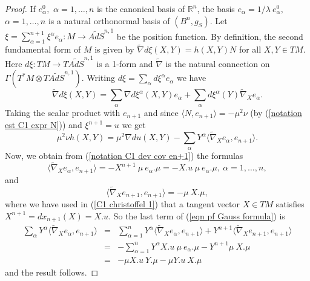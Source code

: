 \documentclass[10pt,reqno,oneside]{amsart}
\theoremstyle{definition}
\theoremstyle{remark}
\newcommand{\R}{\mathbb{R}}
\begin{document}
\begin{proof}
If $e_\alpha^0,$ $\alpha=1,\ldots,n$ is the canonical basis of $\R^{n}$, the basis $e_{\alpha}=1/\lambda\ e_{\alpha}^0,$ $\alpha=1,\ldots, n$ is a natural orthonormal basis of $(B^n,g_S)$. Let $\xi=\sum_{\alpha=1}^{n+1}\xi^\alpha e_\alpha:M\rightarrow\widetilde{AdS}^{n,1}$ be the position function. By definition, the second fundamental form of $M$ is given by $\widetilde{\nabla}d\xi(X,Y)=h(X,Y)N$ for all $X,Y\in TM.$ Here $d\xi:TM\rightarrow T\widetilde{AdS}^{n,1}$ is a 1-form and $\widetilde{\nabla}$ is the natural connection on $\Gamma(T^*M\otimes T\widetilde{AdS}^{n,1}).$ Writing $d\xi=\sum_{\alpha}d\xi^{\alpha}e_{\alpha}$ we have
\begin{equation*}
\widetilde{\nabla}d\xi(X,Y)=\sum_\alpha\nabla d\xi^\alpha(X,Y)e_\alpha+\sum_\alpha d\xi^\alpha(Y)\widetilde{\nabla}_Xe_\alpha.
\end{equation*}
Taking the scalar product with $e_{n+1}$ and since $\langle N,e_{n+1}\rangle=-\mu^2\nu$ (by (\ref{notation est C1 expr N})) and $\xi^{n+1}=u$ we get
\begin{equation}\label{eqn pf Gauss formula}
\mu^2\nu h(X,Y)=\mu^2\nabla du(X,Y)-\sum_\alpha Y^\alpha\langle\widetilde{\nabla}_X e_\alpha,e_{n+1}\rangle.
\end{equation}
Now, we obtain from (\ref{notation C1 dev cov en+1}) the formulas 
\begin{equation}\label{C1 christoffel 1}
\langle\widetilde{\nabla}_Xe_{\alpha},e_{n+1}\rangle=-X^{n+1}\ \mu\ e_\alpha.\mu=-X.u\ \mu\ e_\alpha.\mu,\ \alpha=1,\ldots,n,
\end{equation}
and
\begin{equation}\label{C1 christoffel 2}
\langle\widetilde{\nabla}_Xe_{n+1},e_{n+1}\rangle=-\mu\ X.\mu,
\end{equation}
where we have used in (\ref{C1 christoffel 1}) that a tangent vector $X\in TM$ satisfies $X^{n+1}=dx_{n+1}(X)=X.u$. So the last term of (\ref{eqn pf Gauss formula}) is
\begin{eqnarray*}
\sum_\alpha Y^\alpha\langle\widetilde{\nabla}_X e_\alpha,e_{n+1}\rangle&=&\sum_{\alpha=1}^n Y^\alpha\langle\widetilde{\nabla}_X e_\alpha,e_{n+1}\rangle+Y^{n+1}\langle\widetilde{\nabla}_X e_{n+1},e_{n+1}\rangle\\
&=&-\sum_{\alpha=1}^n Y^\alpha X.u\ \mu\ e_\alpha.\mu-Y^{n+1}\mu\ X.\mu\\
&=&-\mu X.u\ Y.\mu-\mu Y.u\ X.\mu
\end{eqnarray*}
and the result follows.
\end{proof}
\end{document}
